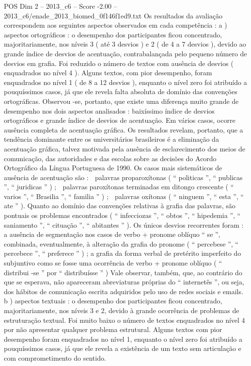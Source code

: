 \begin{textsample}{POS Dim 2 – 2013\_c6 – Score -2.00 – 2013\_c6/enade\_2013\_biomed\_0f146f1ed9.txt}
Os resultados da avaliação correspondem aos seguintes aspectos observados em cada competência : a ) aspectos ortográficos : o desempenho dos participantes ficou concentrado, majoritariamente, nos níveis 3 ( até 3 desvios ) e 2 ( de 4 a 7 desvios ), devido ao grande índice de desvios de acentuação, contrabalançada pelo pequeno número de desvios em grafia.
Foi reduzido o número de textos com ausência de desvios ( enquadrados no nível 4 ).
Alguns textos, com pior desempenho, foram enquadrados no nível 1 ( de 8 a 12 desvios ), enquanto o nível zero foi atribuído a pouquíssimos casos, já que ele revela falta absoluta de domínio das convenções ortográficas.
Observou -se, portanto, que existe uma diferença muito grande de desempenho nos dois aspectos analisados : baixíssimo índice de desvios ortográficos e grande índice de desvios de acentuação.
Em vários casos, ocorre ausência completa de acentuação gráfica.
Os resultados revelam, portanto, que a tendência dominante entre os universitários brasileiros é a eliminação da acentuação gráfica, talvez motivada pela ausência de esclarecimento dos meios de comunicação, das autoridades e das escolas sobre as decisões do Acordo Ortográfico da Língua Portuguesa de 1990.
Os casos mais sistemáticos de ausência de acentuação são :  palavras proparoxítonas ( “ politicas ”, “ publicas ”, “ juridicas ” ) ;  palavras paroxítonas terminadas em ditongo crescente ( “ varios ”, “ Brasilia ”, “ familia ” ) ;  palavras oxítonas ( “ ninguem ”, “ esta ”, “ ate ” ).
Quanto ao domínio das convenções relativas à grafia das palavras, são pontuais os problemas encontrados ( “ infecciozas ”, “ obtos ”, “ hipedemia ”, “ saniamento ”, “ cituação ”, “ abitantes ” ).
Os únicos desvios recorrentes foram : a ausência de segmentação nos casos de verbo + pronome oblíquo “ se ”, combinada, eventualmente, à alteração da grafia do pronome ( “ percebese ”, “ percebece ”, “ preferece ” ) ; a grafia da forma verbal de pretérito imperfeito do subjuntivo como se fosse uma ocorrência de verbo + pronome oblíquo ( “ distribui -se ” por “ distribuísse ” ) Vale observar, também, que, ao contrário do que se esperava, não apareceram abreviaturas próprias do “ internetês ”, ou seja, dos hábitos de comunicação escrita adquiridos pelo uso de redes sociais e emails. b ) aspectos textuais : o desempenho dos participantes ficou concentrado, majoritariamente, nos níveis 3 e 2, devido à grande ocorrência de problemas de estruturação textual.
Foi muito baixo o número de textos enquadrados no nível 4 por não apresentar qualquer problema estrutural.
Alguns textos com pior desempenho foram enquadrados no nível 1, enquanto o nível zero foi atribuído a pouquíssimos casos, já que ele revela a existência de um texto sem articulação e com comprometimento do sentido.

\end{textsample}
